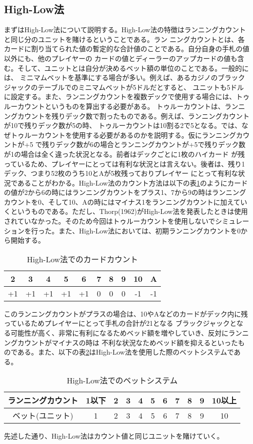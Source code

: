 \subsection{High-Low法}
まずはHigh-Low法について説明する。High-Low法の特徴はランニングカウントと同じ分のユニットを賭けるということである。ラン
ニングカウントとは、各カードに割り当てられた値の暫定的な合計値のことである。自分自身の手札の値以外にも、他のプレイヤーの
カードの値とディーラーのアップカードの値も含む。そして、ユニットとは自分が決めるベット額の単位のことである。一般的には、
ミニマムベットを基準にする場合が多い。例えば、あるカジノのブラックジャックのテーブルでのミニマムベットが5ドルだとすると、
ユニットも5ドルに設定する。また、ランニングカウントを複数デックで使用する場合には、トゥルーカウントというものを算出する必要がある。
トゥルーカウントは、ランニングカウントを残りデック数で割ったものである。例えば、ランニングカウントが10で残りデック数が5の時、
トゥルーカウントは10割る2で5となる。では、なぜトゥルーカウントを使用する必要があるのかを説明する。仮にランニングカウントが+5
で残りデック数が6の場合とランニングカウントが+5で残りデック数が1の場合は全く違った状況となる。前者はデックごとに1枚のハイカード
が残っているため、プレイヤーにとっては有利な状況とは言えない。後者は、残り1デック、つまり52枚のうち10とAが5枚残っておりプレイヤー
にとって有利な状況であることがわかる。High-Low法のカウント方法は以下の表\ref{hlc}のようにカードの値が2から6の時にはランニングカウントをプラス1、7から9の時はランニングカウントを0、そして10、Aの時にはマイナス1をランニングカウントに加えていくというものである。ただし、Thorp(1962)がHigh-Low法を発表したときは使用されていなかった。そのため今回はトゥルーカウントを使用しないでシミュレーションを行った。また、High-Low法においては、初期ランニングカウントを0から開始する。
  \begin{table}[H]
    \centering
    \label{hlc}
    \caption{High-Low法でのカードカウント}
    \begin{tabular}{|c|c|c|c|c|c|c|c|c|c|} \hline
      2&3&4&5&6&7&8&9&10&A \\ \hline
      +1&+1&+1&+1&+1&0&0&0&-1&-1 \\ \hline
    \end{tabular}
  \end{table}
このランニングカウントがプラスの場合は、10やAなどのカードがデック内に残っているためプレイヤーにとって手札の合計が21となる
ブラックジャックとなる可能性が高く、非常に有利になるためベッド額を増やしていき、反対にランニングカウントがマイナスの時は
不利な状況なためベッド額を抑えるといったものである。また、以下の表\ref{hlb}はHigh-Low法を使用した際のベットシステムである。
  \begin{table}[H]
    \centering
    \label{hlb}
    \caption{High-Low法でのベットシステム}
    \begin{tabular}{|c|c|c|c|c|c|c|c|c|c|c|} \hline
      ランニングカウント&1以下&2&3&4&5&6&7&8&9&10以上 \\ \hline
      ベット(ユニット)&1&2&3&4&5&6&7&8&9&10 \\ \hline
    \end{tabular}
  \end{table}
先述した通り、High-Low法はカウント値と同じユニットを賭けていく。

